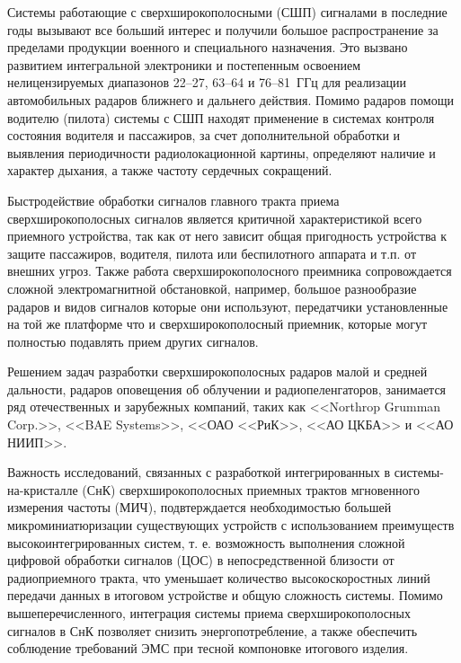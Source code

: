 
{\actuality} Системы работающие с сверхширокополосными (СШП)  сигналами в последние годы вызывают все больший интерес и получили большое распространение за пределами продукции военного и специального назначения. Это вызвано развитием интегральной электроники и постепенным освоением нелицензируемых диапазонов \numrange[]{22}{27}, \numrange[]{63}{64} и \numrange[]{76}{81}~ГГц для реализации автомобильных радаров ближнего и дальнего действия. Помимо радаров помощи водителю (пилота) системы с СШП находят применение в системах контроля состояния водителя и пассажиров, за счет дополнительной обработки и выявления периодичности радиолокационной картины, определяют наличие и характер дыхания, а также частоту сердечных сокращений.

Быстродействие обработки сигналов главного тракта приема сверхширокополосных сигналов является критичной характеристикой всего приемного устройства, так как от него зависит общая пригодность устройства к защите пассажиров, водителя, пилота или беспилотного аппарата и т.п. от внешних угроз. Также работа сверхширокополосного преимника сопровождается сложной электромагнитной обстановкой, например, большое разнообразие радаров и видов сигналов которые они используют, передатчики установленные на той же платформе что и сверхширокополосный приемник, которые могут полностью подавлять прием других сигналов.

Решением задач разработки сверхширокополосных радаров малой и средней дальности, радаров оповещения об облучении и радиопеленгаторов, занимается ряд отечественных и зарубежных компаний, таких как  <<Northrop Grumman Corp.>>, <<BAE Systems>>, <<ОАО <<РиК>>, <<АО ЦКБА>> и <<АО НИИП>>.

Важность исследований, связанных с разработкой интегрированных в системы-на-кристалле (СнК) сверхширокополосных приемных трактов мгновенного измерения частоты (МИЧ), подвтерждается необходимостью большей микроминиатюризации существующих устройств с использованием преимуществ высокоинтегрированных систем, т. е. возможность выполнения сложной цифровой обработки сигналов (ЦОС) в непосредственной близости от радиоприемного тракта, что уменьшает количество высокоскоростных линий передачи данных в итоговом устройстве и общую сложность системы. Помимо вышеперечисленного, интеграция системы приема сверхширокополосных сигналов в СнК позволяет снизить энергопотребление, а также обеспечить соблюдение требований ЭМС при тесной компоновке итогового изделия.

